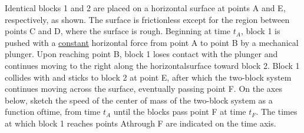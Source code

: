 \documentclass[12pt]{exam}
\newcommand{\pic}[2]{
  \begin{center}
    \texttt{[image: \#2]}
  \end{center}
}
\begin{document}
\begin{questions}
  \uplevel{
    \centering
    \pic{.5}{plunger}
  }
  \question[7] Identical blocks 1 and 2 are placed on a horizontal surface at
  points A and E, respectively, as shown. The surface is frictionless except
  for the region between points C and D, where the surface is rough. Beginning
  at time $t_A$, block 1 is pushed with a \underline{constant} horizontal force
  from point A to point B by a mechanical plunger. Upon reaching point B, block
  1 loses contact with the plunger and continues moving to the right along the
  horizontalsurface toward block 2. Block 1 collides with and sticks to block 2
  at point E, after which the two-block system continues moving across the
  surface, eventually passing point F. On the axes below, sketch the speed of
  the center of mass of the two-block system as a function oftime, from time
  $t_A$ until the blocks pass point F at time $t_F$. The times at which block 1
  reaches points Athrough F are indicated on the time axis.
\end{questions}
\end{document}

